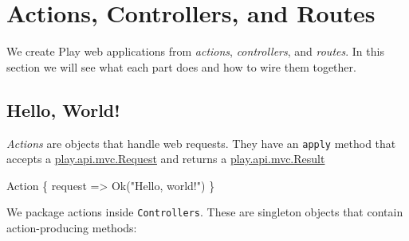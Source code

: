 \documentclass[oneside,11pt,a4paper,]{book}
\newenvironment{Shaded}{\begin{snugshade}}{\end{snugshade}}
\newcommand{\KeywordTok}[1]{\textcolor[rgb]{0.13,0.29,0.53}{\textbf{{#1}}}}
\newcommand{\StringTok}[1]{\textcolor[rgb]{0.31,0.60,0.02}{{#1}}}
\newcommand{\FunctionTok}[1]{\textcolor[rgb]{0.00,0.00,0.00}{{#1}}}
\newcommand{\NormalTok}[1]{{#1}}
\begin{document}
\section{Actions, Controllers, and
Routes}\label{actions-controllers-and-routes}

We create Play web applications from \emph{actions}, \emph{controllers},
and \emph{routes}. In this section we will see what each part does and
how to wire them together.

\subsection{Hello, World!}\label{hello-world}

\emph{Actions} are objects that handle web requests. They have an
\texttt{apply} method that accepts a
\href{https://www.playframework.com/documentation/2.3.x/api/scala/index.html\#play.api.mvc.Request}{play.api.mvc.Request}
and returns a
\href{https://www.playframework.com/documentation/2.3.x/api/scala/index.html\#play.api.mvc.Result}{play.api.mvc.Result}

\begin{Shaded}
\begin{Highlighting}[]
\NormalTok{Action \{ request =>}
  \FunctionTok{Ok}\NormalTok{(}\StringTok{"Hello, world!"}\NormalTok{)}
\NormalTok{\}}
\end{Highlighting}
\end{Shaded}

We package actions inside \texttt{Controllers}. These are singleton
objects that contain action-producing methods:

\begin{Shaded}
\end{Shaded}
\end{document}
